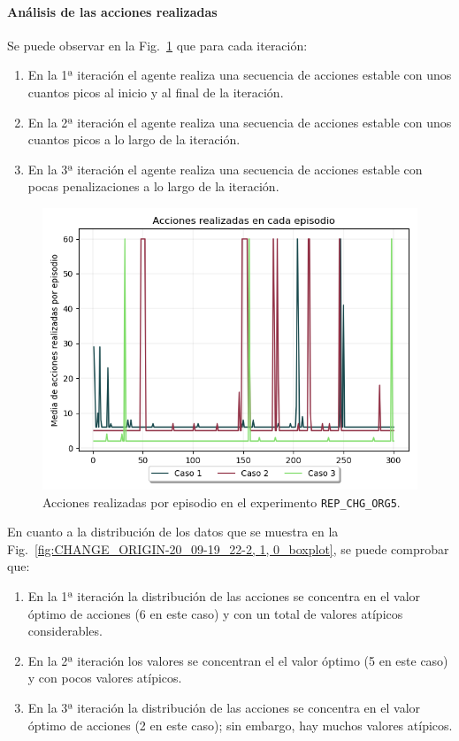 \paragraph{Análisis de las acciones realizadas}

Se puede observar en la Fig.~\ref{fig:CHANGE_ORIGIN-20_09-19_22-2, 1, 0_acciones} que para cada iteración: 
\begin{enumerate}
    \item En la 1ª iteración el agente realiza una secuencia de acciones estable con unos cuantos picos al inicio y al final de la iteración. 
    \item En la 2ª iteración el agente realiza una secuencia de acciones estable con unos cuantos picos a lo largo de la iteración. 
    \item En la 3ª iteración el agente realiza una secuencia de acciones estable con pocas penalizaciones a lo largo de la iteración. 
\end{enumerate}
  
\begin{figure}
    \centering
    \includegraphics[scale=0.4]{cap5_experimentacion/images/CHANGE_ORIGIN-20_09-19_22-2, 1, 0_acciones.png}
    \caption{Acciones realizadas por episodio en el experimento \texttt{REP\_CHG\_ORG5}.}
    \label{fig:CHANGE_ORIGIN-20_09-19_22-2, 1, 0_acciones}
\end{figure}

En cuanto a la distribución de los datos que se muestra en la Fig.~\ref{fig:CHANGE_ORIGIN-20_09-19_22-2, 1, 0_boxplot}, se puede comprobar que:
\begin{enumerate}
    \item En la 1ª iteración la distribución de las acciones se concentra en el valor óptimo de acciones (6 en este caso) y con un total de valores atípicos considerables.
    \item En la 2ª iteración los valores se concentran el el valor óptimo (5 en este caso) y con pocos valores atípicos.
    \item En la 3ª iteración la distribución de las acciones se concentra en el valor óptimo de acciones (2 en este caso); sin embargo, hay muchos valores atípicos.
\end{enumerate} 
 

